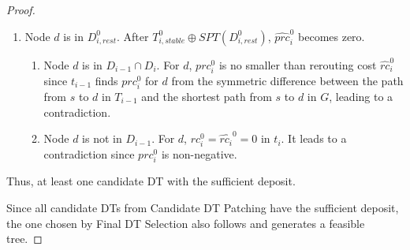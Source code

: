 \documentclass[10pt, conference, letterpaper]{IEEEtran}
\theoremstyle{definition}
\begin{document}
\begin{proof}
\begin{enumerate}
\item Node $d$ is in $D_{i,rest}^0$. After $T_{i,stable}^{0} \oplus SPT(D_{i,rest}^{0})$, $\hat{prc}_i^{0}$ becomes zero.
\begin{enumerate}
\item Node $d$ is in $D_{i-1}\cap D_{i}$. For $d$, $prc_i^{0}$ 
is no smaller than rerouting cost $\hat{rc}_i^{0}$
since $t_{i-1}$ finds $prc_i^{0}$ for $d$ from the symmetric difference between the path from $s$ to $d$ in $T_{i-1}$ and the shortest path from $s$ to $d$ in $G$, leading to a contradiction.
\item Node $d$ is not in $D_{i-1}$. For $d$, $rc_i^{0}=\hat{rc_i}^{0}=0$ in $t_i$. It leads to a contradiction since $prc_i^{0}$ is non-negative.
\end{enumerate}
\end{enumerate}
Thus, at least one candidate DT 
with the sufficient deposit.

Since all candidate DTs from Candidate DT Patching
have the sufficient deposit,
the one chosen by Final DT Selection also follows and generates a feasible tree.
\end{proof}
\end{document}
